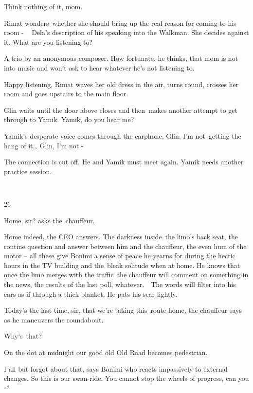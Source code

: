 \documentclass[letterpaper]{article}
\begin{document}
{\textquotedbl}Think nothing of it, mom.{\textquotedbl} 

Rimat wonders~whether she should bring up the real reason for coming to his room - ~ Dela's description of his speaking
into the Walkman. She decides against it. {\textquotedbl}What are you listening to?{\textquotedbl} 

{\textquotedbl}A trio by an anonymous composer.{\textquotedbl} How fortunate, he thinks, that mom is not into music and
won't ask to hear whatever he's  not listening to. 

{\textquotedbl}Happy listening,{\textquotedbl} Rimat waves her old dress in the air, turns round, crosses her room and
goes upstairs to the main floor.

Glin waits until the door above closes and then~makes another attempt to get through to Yamik. {\textquotedbl}Yamik, do
you hear me?{\textquotedbl} 

Yamik's desperate voice comes through the earphone, {\textquotedbl}Glin, I'm not~getting the hang of it{\dots} Glin, I'm
not {}-{\textquotedbl}

The connection is cut off. He and Yamik must meet again. Yamik needs another practice session. 

~

26

{\textquotedbl}Home, sir?{\textquotedbl} asks the~chauffeur. 

{\textquotedbl}Home indeed,{\textquotedbl} the CEO answers. The darkness inside\textcolor{red}{\ }the limo's back seat,
the routine question and answer between him and the chauffeur, the even hum of the motor -- all these give Bonimi a
sense of peace he yearns for during the hectic hours in the TV building and the\textcolor{red}{\ }bleak solitude when
at home. He knows that once the limo merges with the traffic~the chauffeur will comment on something in the news, the
results of the last poll, whatever.\ \ The words will filter into his ears as if through a thick blanket. He pats his
scar lightly.

{\textquotedbl}Today's the last time, sir, that we're taking this\ route home,{\textquotedbl} the chauffeur says as he
maneuvers the roundabout. 

{\textquotedbl}Why's\ that?{\textquotedbl} 

{\textquotedbl}On the dot at midnight our good old Old Road becomes pedestrian.{\textquotedbl} 

{\textquotedbl}I all but forgot about that,{\textquotedbl} says Bonimi who reacts impassively to external changes.
{\textquotedbl}So this is our swan-ride. You cannot stop the wheels of progress, can you -{}'' 
\end{document}
